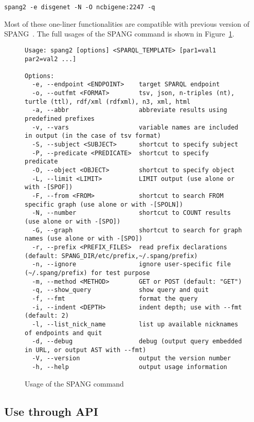 \documentclass[runningheads]{llncs}
\begin{document}
\texttt{spang2 -e disgenet -N -O ncbigene:2247 -q}

\noindent Most of these one-liner functionalities are compatible with previous version of SPANG~\cite{spang}. The full usages of the SPANG command is shown in Figure~\ref{fig:spang-command}.


\begin{figure}[!t]
\begin{scriptsize}
\begin{verbatim}
Usage: spang2 [options] <SPARQL_TEMPLATE> [par1=val1 par2=val2 ...]

Options:
  -e, --endpoint <ENDPOINT>    target SPARQL endpoint
  -o, --outfmt <FORMAT>        tsv, json, n-triples (nt), turtle (ttl), rdf/xml (rdfxml), n3, xml, html
  -a, --abbr                   abbreviate results using predefined prefixes
  -v, --vars                   variable names are included in output (in the case of tsv format)
  -S, --subject <SUBJECT>      shortcut to specify subject
  -P, --predicate <PREDICATE>  shortcut to specify predicate
  -O, --object <OBJECT>        shortcut to specify object
  -L, --limit <LIMIT>          LIMIT output (use alone or with -[SPOF])
  -F, --from <FROM>            shortcut to search FROM specific graph (use alone or with -[SPOLN])
  -N, --number                 shortcut to COUNT results (use alone or with -[SPO])
  -G, --graph                  shortcut to search for graph names (use alone or with -[SPO])
  -r, --prefix <PREFIX_FILES>  read prefix declarations (default: SPANG_DIR/etc/prefix,~/.spang/prefix)
  -n, --ignore                 ignore user-specific file (~/.spang/prefix) for test purpose
  -m, --method <METHOD>        GET or POST (default: "GET")
  -q, --show_query             show query and quit
  -f, --fmt                    format the query
  -i, --indent <DEPTH>         indent depth; use with --fmt (default: 2)
  -l, --list_nick_name         list up available nicknames of endpoints and quit
  -d, --debug                  debug (output query embedded in URL, or output AST with --fmt)
  -V, --version                output the version number
  -h, --help                   output usage information

\end{verbatim}
\end{scriptsize}
\caption{Usage of the SPANG command}
\label{fig:spang-command}
\end{figure}


\subsection{Use through API}
\end{document}
